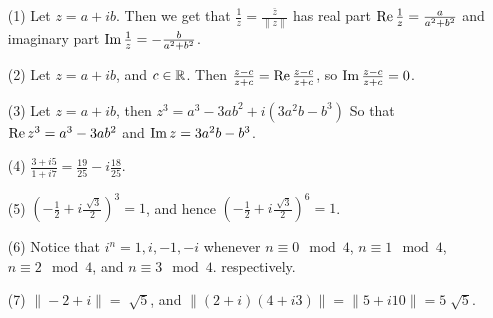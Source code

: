 \begin{example}\label{example_1.1}
    \begin{enumerate}
        \item[(1)] Let $z=a+ib$. Then we get that
            $\frac{1}{z}=\frac{\bar{z}}{\|z\|}$ has real part
            $\operatorname{Re}{\frac{1}{z}}=\frac{a}{a^2+b^2}$ and imaginary part
            $\operatorname{Im}{\frac{1}{z}}=-\frac{b}{a^2+b^2}$.

        \item[(2)] Let $z=a+ib$, and  $c \in \mathbb{R}$. Then
            $\frac{z-c}{z+c}=\operatorname{Re}{\frac{z-c}{z+c}}$, so $\operatorname{Im}{\frac{z-c}{z+c}}=0$.

        \item[(3)] Let $z=a+ib$, then $z^3=a^3-3ab^2+i(3a^2b-b^3)$ So that
            $\operatorname{Re}{z^3}=a^3-3ab^2$ and $\operatorname{Im}{z}=3a^2b-b^3$.

        \item[(4)] $\frac{3+i5}{1+i7}=\frac{19}{25}-i\frac{18}{25}$.

        \item[(5)] $(-\frac{1}{2}+i\frac{\sqrt[]{3}}{2})^3=1$, and hence
            $(-\frac{1}{2}+i\frac{\sqrt[]{3}}{2})^6=1$.

        \item[(6)] Notice that $i^n=1,i,-1,-i$ whenever  $n \equiv 0 \mod{4}$,
            $n \equiv 1 \mod{4}$, $n \equiv 2 \mod{4}$, and $n \equiv 3
            \mod{4}$.
            respectively.

        \item[(7)] $\|-2+i\|=\sqrt[]{5}$, and
            $\|(2+i)(4+i3)\|=\|5+i10\|=5\sqrt[]{5}$.
    \end{enumerate}
\end{example}


